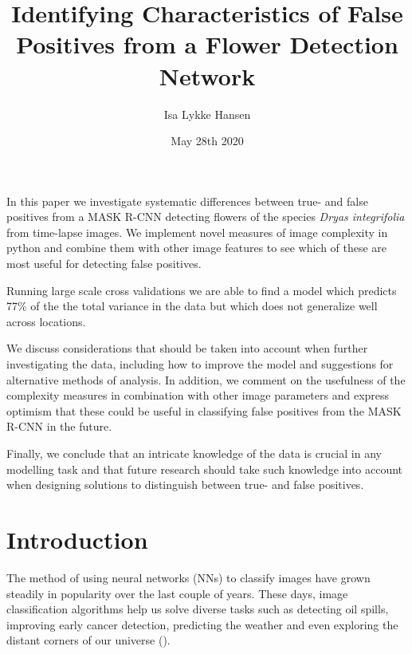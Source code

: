\documentclass[12pt]{article}
\title{Identifying Characteristics of False Positives from a Flower Detection Network}
\author{Isa Lykke Hansen}
\date{May 28th 2020}
\begin{document}
\onehalfspacing

\begin{titlepage}
	\maketitle
	\newpage
\end{titlepage}

\abstract{}

In this paper we investigate systematic differences between true- and false positives from a MASK R-CNN detecting flowers of the species \textit{Dryas integrifolia} from time-lapse images. We implement novel measures of image complexity in python and combine them with other image features to see which of these are most useful for detecting false positives.

Running large scale cross validations we are able to find a model which predicts 77\% of the the total variance in the data but which does not generalize well across locations. 

We discuss considerations that should be taken into account when further investigating the data, including how to improve the model and suggestions for alternative methods of analysis. In addition, we comment on the usefulness of the complexity measures in combination with other image parameters and express optimism that these could be useful in classifying false positives from the MASK R-CNN in the future.

Finally, we conclude that an intricate knowledge of the data is crucial in any modelling task and that future research should take such knowledge into account when designing solutions to distinguish between true- and false positives.

\clearpage
\tableofcontents
\clearpage

\section{Introduction}
The method of using neural networks (NNs) to classify images have grown steadily in popularity over the last couple of years. These days, image classification algorithms help us solve diverse tasks such as detecting oil spills, improving early cancer detection, predicting the weather and even exploring the distant corners of our universe (\cite{vestfalenAarhusHeleByen2019,ekiciBreastCancerDiagnosis2020,abhishekWeatherForecastingModel2012,krastevRealtimeDetectionGravitational2020}).
\end{document}
